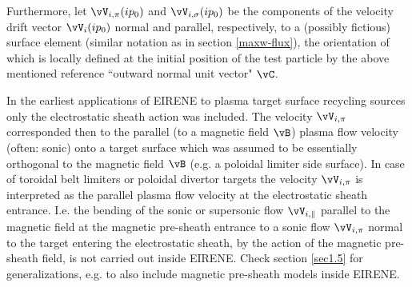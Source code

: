 Furthermore, let $\vV_{i,\pi}(ip_0) $ and $ \vV_{i,\sigma}(ip_0) $
be the
components of the velocity drift vector $\vV_i(ip_0) $ normal
and parallel,
respectively, to a (possibly fictious) surface element
(similar  notation as in section \ref{maxw-flux}), the
orientation of which is locally defined at the initial position of
the test particle by the above mentioned reference ``outward normal unit
vector" $\vC$.

In the earliest applications of EIRENE to plasma target
surface recycling sources
only the electrostatic sheath action was included.
The velocity $\vV_{i,\pi}$ corresponded then to the parallel (to a magnetic field $\vB$)
plasma flow velocity (often: sonic) onto a target surface which was assumed to be essentially
orthogonal to the magnetic field $\vB$ (e.g. a poloidal limiter side surface).
In case of toroidal belt limiters or poloidal divertor targets the velocity $\vV_{i,\pi}$
is interpreted as the parallel plasma flow velocity at the electrostatic sheath entrance.
I.e. the bending of the sonic or supersonic flow $\vV_{i,\|}$ parallel to the magnetic field
at the magnetic pre-sheath entrance
to a sonic flow $\vV_{i,\pi}$ normal to the target entering the electrostatic sheath,
by the action of the magnetic pre-sheath field, is not carried out inside EIRENE.
Check section \ref{sec1.5} for generalizations, e.g. to also include magnetic pre-sheath models inside EIRENE.



